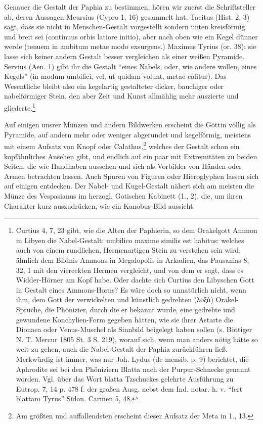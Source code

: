 \documentclass[a4paper, 11pt, oneside, polutonikogreek, german]{article}
\begin{document}
Genauer die Gestalt der Paphia zu bestimmen, hören wir zuerst die Schriftsteller ab, deren Aussagen Meursius (Cypro 1, 16) gesammelt hat. Tacitus (Hist. 2, 3) sagt, dass sie nicht in Menschen-Gestalt vorgestellt sondern unten kreisförmig und breit sei (continuus orbis latiore initio), aber nach oben wie ein Kegel dünner werde (tenuem in ambitum metae modo exsurgens.) Maximus Tyrius (or. 38): sie lasse sich keiner andern Gestalt besser vergleichen als einer weißen Pyramide. Servius (Aen. 1) gibt ihr die Gestalt "`eines Nabels, oder, wie andere wollen, eines Kegels"' (in modum umbilici, vel, ut quidam volunt, metae colitur). Das Wesentliche bleibt also ein kegelartig gestalteter dicker, bauchiger oder nabelförmiger Stein, den aber Zeit und Kunst allmählig mehr auszierte und gliederte.\footnote{Curtius 4, 7, 23 gibt, wie die Alten der Paphierin, so dem Orakelgott Ammon in Libyen die Nabel-Gestalt: umbilico maxime similis est habitus: welches auch von einem rundlichen, Hermenartigen Stein zu verstehen sein wird, ähnlich dem Bildnis Ammons in Megalopolis in Arkadien, das Pausanias 8, 32, 1 mit den viereckten Hermen vergleicht, und von dem er sagt, dass es Widder-Hörner am Kopf habe. Oder dachte sich Curtius den Libyschen Gott in Gestalt eines Ammons-Horns? Es wäre doch so unnatürlich nicht, wenn ihm, dem Gott der verwickelten und künstlich gedrehten (λοξὰ) Orakel-Sprüche, die Phönizier, durch die er bekannt wurde, eine gedrehte und gewundene Konchylien-Form gegeben hätten, wie sie ihrer Astarte die Dionaea oder Venus-Muschel als Sinnbild beigelegt haben sollen (s. Böttiger N. T. Mercur 1805 St. 3 S. 219), worauf sich, wenn man anders nötig hätte so weit zu gehen, auch die Nabel-Gestalt der Paphia zurückführen ließ. Merkwürdig ist immer, was nur Joh. Lydus (de mensib. p. 9) berichtet, die Aphrodite sei bei den Phöniziern Blatta nach der Purpur-Schnecke genannt worden. Vgl. über das Wort blatta Tzschuckes gelehrte Ausführung zu Eutrop. 7, 14 p. 478 f. der großen Ausg. nebst dem Ind. notar. h. v. "`fert blattam Tyrus"' Sidon. Carmen 5, 48.}

Auf einigen unsrer Münzen und andern Bildwerken erscheint die Göttin völlig als Pyramide, auf andern mehr oder weniger abgerundet und kegelförmig, meistens mit einem Aufsatz von Knopf oder Calathus,\footnote{Am größten und auffallendsten erscheint dieser Aufsatz der Meta in 1., 13.} welches der Gestalt schon ein kopfähnliches Ansehen gibt, und endlich auf ein paar mit Extremitäten zu beiden Seiten, die wie Handhaben aussehen und sich als Vorbilder von Händen oder Armen betrachten lassen. Auch Spuren von Figuren oder Hieroglyphen lassen sich auf einigen entdecken. Der Nabel- und Kugel-Gestalt nähert sich am meisten die Münze des Vespasianus im herzogl. Gotischen Kabinett (1., 2), die, um ihren Charakter kurz auszudrücken, wie ein Kanobus-Bild aussieht.
\end{document}
